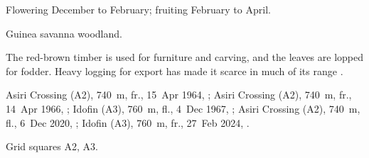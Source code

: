  Flowering December to February; fruiting February
to April.

 Guinea savanna woodland.

 The red-brown timber is used for furniture and carving,
and the leaves are lopped for fodder. Heavy logging for export has
made it scarce in much of its range \citep{arbonnier2004,orwa2009}.

 Asiri Crossing (A2), 740~m, fr., 15~Apr 1964, ;
Asiri Crossing (A2), 740~m, fr., 14~Apr 1966, ;
Idofin (A3), 760~m, fl., 4~Dec 1967, ;
Asiri Crossing (A2), 740~m, fl., 6~Dec 2020, ;
Idofin (A3), 760~m, fr., 27~Feb 2024, .

 Grid squares A2, A3.

\begin{center}
\end{center}